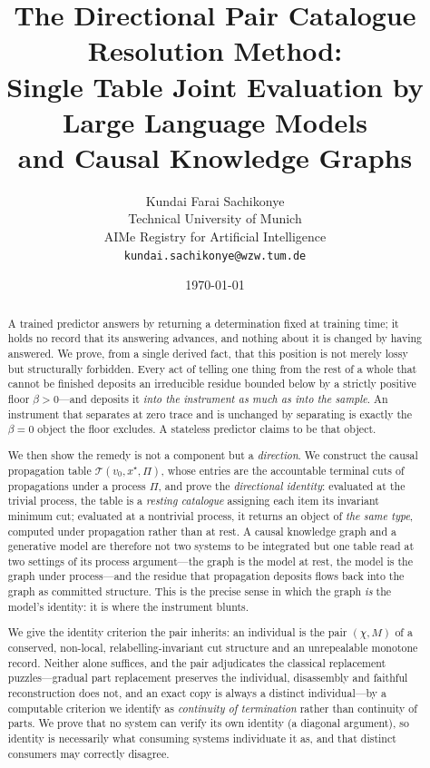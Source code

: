 \documentclass[11pt,twocolumn,a4paper]{article}
\title{\textbf{The Directional Pair Catalogue Resolution Method:\\[3pt]
Single Table Joint Evaluation by Large Language Models \\ and Causal Knowledge Graphs}}
\author{%
Kundai Farai Sachikonye\\
\small Technical University of Munich\\
\small AIMe Registry for Artificial Intelligence\\
\small \texttt{kundai.sachikonye@wzw.tum.de}}
\date{\today}
\theoremstyle{dirthm}
\theoremstyle{definition}
\theoremstyle{remark}
\newcommand{\flo}{\beta}
\newcommand{\rec}{M}
\newcommand{\Char}{\chi}
\newcommand{\Proc}{\Pi}
\newcommand{\Tab}{\mathcal{T}}
\begin{document}
\maketitle

\begin{abstract}
\noindent
A trained predictor answers by returning a determination fixed at training
time; it holds no record that its answering advances, and nothing about it
is changed by having answered. We prove, from a single derived fact, that
this position is not merely lossy but structurally forbidden. Every act of
telling one thing from the rest of a whole that cannot be finished deposits
an irreducible residue bounded below by a strictly positive floor
$\flo>0$---and deposits it \emph{into the instrument as much as into the
sample}. An instrument that separates at zero trace and is unchanged by
separating is exactly the $\flo=0$ object the floor excludes. A stateless
predictor claims to be that object.

We then show the remedy is not a component but a \emph{direction}. We
construct the causal propagation table $\Tab(v_0,x^{\star},\Proc)$, whose
entries are the accountable terminal cuts of propagations under a process
$\Proc$, and prove the \emph{directional identity}: evaluated at the trivial
process, the table is a \emph{resting catalogue} assigning each item its
invariant minimum cut; evaluated at a nontrivial process, it returns an
object of \emph{the same type}, computed under propagation rather than at
rest. A causal knowledge graph and a generative model are therefore not two
systems to be integrated but one table read at two settings of its process
argument---the graph is the model at rest, the model is the graph under
process---and the residue that propagation deposits flows back into the
graph as committed structure. This is the precise sense in which the graph
\emph{is} the model's identity: it is where the instrument blunts.

We give the identity criterion the pair inherits: an individual is the pair
$(\Char,\rec)$ of a conserved, non-local, relabelling-invariant cut structure
and an unrepealable monotone record. Neither alone suffices, and the pair
adjudicates the classical replacement puzzles---gradual part replacement
preserves the individual, disassembly and faithful reconstruction does not,
and an exact copy is always a distinct individual---by a computable
criterion we identify as \emph{continuity of termination} rather than
continuity of parts. We prove that no system can verify its own identity
(a diagonal argument), so identity is necessarily what consuming systems
individuate it as, and that distinct consumers may correctly disagree.


\end{abstract}
\end{document}
